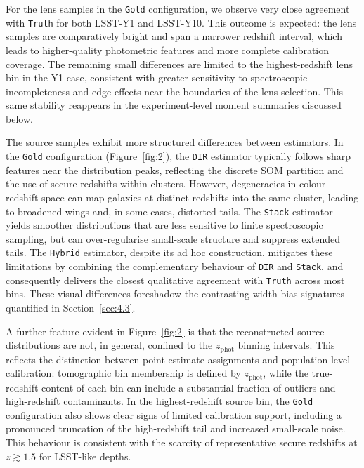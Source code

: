 For the lens samples in the \texttt{Gold} configuration, we observe very close agreement with \texttt{Truth} for both LSST-Y1 and LSST-Y10. This outcome is expected: the lens samples are comparatively bright and span a narrower redshift interval, which leads to higher-quality photometric features and more complete calibration coverage. The remaining small differences are limited to the highest-redshift lens bin in the Y1 case, consistent with greater sensitivity to spectroscopic incompleteness and edge effects near the boundaries of the lens selection. This same stability reappears in the experiment-level moment summaries discussed below.

The source samples exhibit more structured differences between estimators. In the \texttt{Gold} configuration (Figure~\ref{fig:2}), the \texttt{DIR} estimator typically follows sharp features near the distribution peaks, reflecting the discrete SOM partition and the use of secure redshifts within clusters. However, degeneracies in colour--redshift space can map galaxies at distinct redshifts into the same cluster, leading to broadened wings and, in some cases, distorted tails. The \texttt{Stack} estimator yields smoother distributions that are less sensitive to finite spectroscopic sampling, but can over-regularise small-scale structure and suppress extended tails. The \texttt{Hybrid} estimator, despite its ad hoc construction, mitigates these limitations by combining the complementary behaviour of \texttt{DIR} and \texttt{Stack}, and consequently delivers the closest qualitative agreement with \texttt{Truth} across most bins. These visual differences foreshadow the contrasting width-bias signatures quantified in Section~\ref{sec:4.3}.

A further feature evident in Figure~\ref{fig:2} is that the reconstructed source distributions are not, in general, confined to the \(z_{\text{phot}}\) binning intervals. This reflects the distinction between point-estimate assignments and population-level calibration: tomographic bin membership is defined by \(z_{\text{phot}}\), while the true-redshift content of each bin can include a substantial fraction of outliers and high-redshift contaminants. In the highest-redshift source bin, the \texttt{Gold} configuration also shows clear signs of limited calibration support, including a pronounced truncation of the high-redshift tail and increased small-scale noise. This behaviour is consistent with the scarcity of representative secure redshifts at \(z \gtrsim 1.5\) for LSST-like depths.

